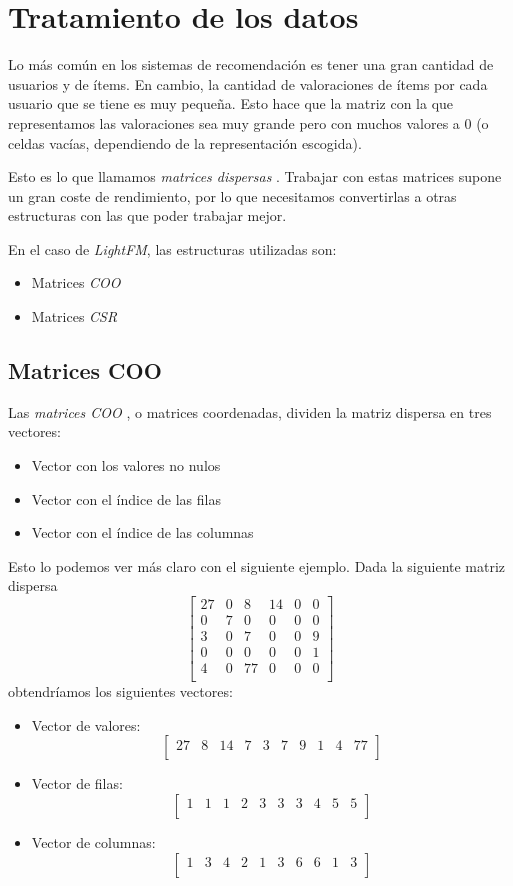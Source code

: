 \section{Tratamiento de los datos}\label{tratamiento-datos}
Lo más común en los sistemas de recomendación es tener una gran cantidad de usuarios y de ítems. En cambio, la cantidad de valoraciones de ítems por cada usuario que se tiene es muy pequeña. Esto hace que la matriz con la que representamos las valoraciones sea muy grande pero con muchos valores a 0 (o celdas vacías, dependiendo de la representación escogida).  

Esto es lo que llamamos \textit{matrices dispersas} \cite{wiki:Sparse_matrix}. Trabajar con estas matrices supone un gran coste de rendimiento, por lo que necesitamos convertirlas a otras estructuras con las que poder trabajar mejor.

En el caso de \textit{LightFM}, las estructuras utilizadas son:
\begin{itemize}
\tightlist
\item Matrices \textit{COO}
\item Matrices \textit{CSR}  
\end{itemize}

\subsection{Matrices COO}\label{matrices-coo}
Las \textit{matrices COO} \cite{coo-matrix}, o matrices coordenadas, dividen la matriz dispersa en tres vectores:
\begin{itemize}
\tightlist
\item Vector con los valores no nulos
\item Vector con el índice de las filas
\item Vector con el índice de las columnas
\end{itemize}
Esto lo podemos ver más claro con el siguiente ejemplo. Dada la siguiente matriz dispersa
\[\begin{bmatrix}
27&0&8&14&0&0\\
0&7&0&0&0&0\\
3&0&7&0&0&9\\
0&0&0&0&0&1\\
4&0&77&0&0&0\\
\end{bmatrix}\]
obtendríamos los siguientes vectores:
\begin{itemize}
\tightlist
\item Vector de valores: \[\begin{bmatrix} 27&8&14&7&3&7&9&1&4&77\\\end{bmatrix}\]
\item Vector de filas: \[\begin{bmatrix} 1&1&1&2&3&3&3&4&5&5\\\end{bmatrix}\]
\item Vector de columnas: \[\begin{bmatrix} 1&3&4&2&1&3&6&6&1&3\\
\end{bmatrix}\]
\end{itemize}

